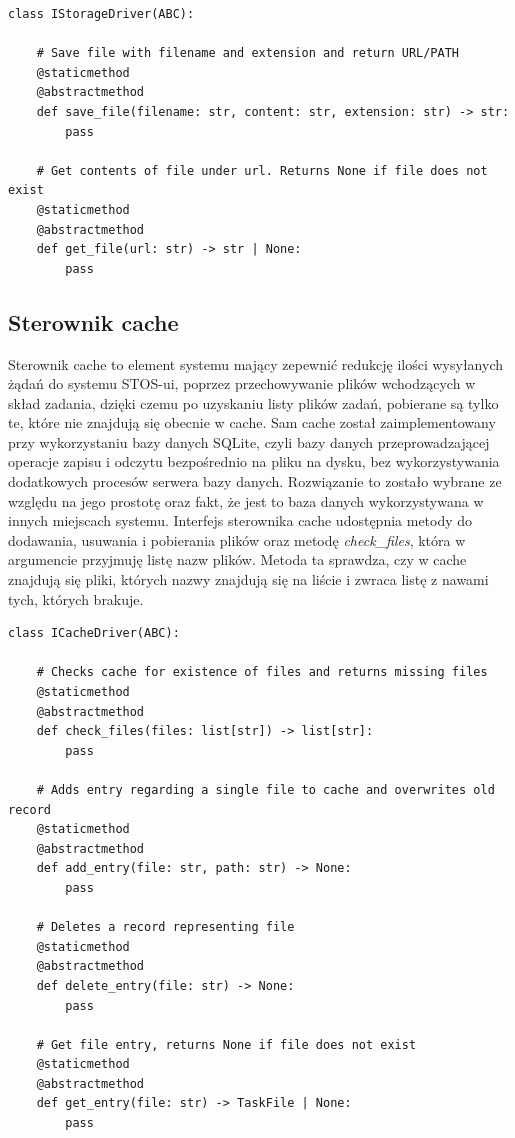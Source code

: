 \lstset{style=python}
\begin{lstlisting}[caption = {Interfejs sterownika systemu plików.}]
    class IStorageDriver(ABC):
    
    # Save file with filename and extension and return URL/PATH
    @staticmethod
    @abstractmethod
    def save_file(filename: str, content: str, extension: str) -> str:
        pass

    # Get contents of file under url. Returns None if file does not exist
    @staticmethod
    @abstractmethod
    def get_file(url: str) -> str | None:
        pass
\end{lstlisting}

\subsection{Sterownik cache}
Sterownik cache to element systemu mający zepewnić redukcję ilości wysyłanych żądań do systemu STOS-ui, poprzez przechowywanie plików wchodzących w skład zadania, dzięki czemu po uzyskaniu listy plików zadań, pobierane są tylko te, które nie znajdują się obecnie w cache. Sam cache został zaimplementowany przy wykorzystaniu bazy danych SQLite\cite{sqlite}, czyli bazy danych przeprowadzającej operacje zapisu i odczytu bezpośrednio na pliku na dysku, bez wykorzystywania dodatkowych procesów serwera bazy danych. Rozwiązanie to zostało wybrane ze względu na jego prostotę oraz fakt, że jest to baza danych wykorzystywana w innych miejscach systemu. Interfejs sterownika cache udostępnia metody do dodawania, usuwania i pobierania plików oraz metodę \textit{check\_files}, która w argumencie przyjmuję listę nazw plików. Metoda ta sprawdza, czy w cache znajdują się pliki, których nazwy znajdują się na liście i zwraca listę z nawami tych, których brakuje.
\lstset{style=python}
\begin{lstlisting}[caption = {Interfejs sterownika systemu plików.}]
    class ICacheDriver(ABC):

    # Checks cache for existence of files and returns missing files
    @staticmethod
    @abstractmethod
    def check_files(files: list[str]) -> list[str]:
        pass

    # Adds entry regarding a single file to cache and overwrites old record
    @staticmethod
    @abstractmethod
    def add_entry(file: str, path: str) -> None:
        pass

    # Deletes a record representing file
    @staticmethod
    @abstractmethod
    def delete_entry(file: str) -> None:
        pass

    # Get file entry, returns None if file does not exist
    @staticmethod
    @abstractmethod
    def get_entry(file: str) -> TaskFile | None:
        pass
\end{lstlisting}

